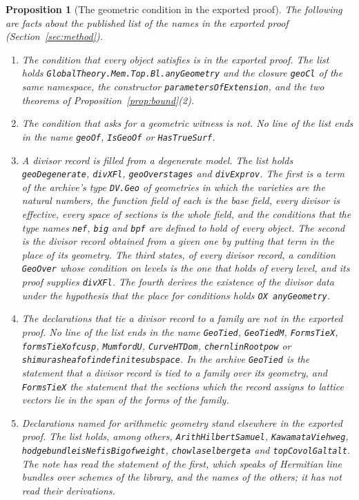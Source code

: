 \documentclass[11pt]{article}
\newtheorem{proposition}[theorem]{Proposition}
\theoremstyle{definition}
\theoremstyle{remark}
\DeclareRobustCommand{\lean}[1]{{\renewcommand{\_}{\textunderscore\allowbreak}\texttt{#1}}}
\begin{document}
\begin{proposition}[The geometric condition in the exported proof]\label{prop:compiled}
The following are facts about the published list of the names in the exported proof (Section~\ref{sec:method}).
\begin{enumerate}[leftmargin=2em,itemsep=1pt]\sloppy
\item \emph{The condition that every object satisfies is in the exported proof.} The list holds \lean{GlobalTheory.Mem.Top.Bl.anyGeometry} and the closure \lean{geoCl} of the same namespace, the constructor \lean{parametersOfExtension}, and the two theorems of Proposition~\ref{prop:bound}(2).
\item \emph{The condition that asks for a geometric witness is not.} No line of the list ends in the name \lean{geoOf}, \lean{IsGeoOf} or \lean{HasTrueSurf}.
\item \emph{A divisor record is filled from a degenerate model.} The list holds \lean{geoDegenerate}, \lean{divXFl}, \lean{geoOver\_stages} and \lean{divEx\_prov}. The first is a term of the archive's type \lean{DV.Geo} of geometries in which the varieties are the natural numbers, the function field of each is the base field, every divisor is effective, every space of sections is the whole field, and the conditions that the type names \lean{nef}, \lean{big} and \lean{bpf} are defined to hold of every object. The second is the divisor record obtained from a given one by putting that term in the place of its geometry. The third states, of every divisor record, a condition \lean{GeoOver} whose condition on levels is the one that holds of every level, and its proof supplies \lean{divXFl}. The fourth derives the existence of the divisor data under the hypothesis that the place for conditions holds \lean{OX anyGeometry}.
\item \emph{The declarations that tie a divisor record to a family are not in the exported proof.} No line of the list ends in the name \lean{GeoTied}, \lean{GeoTiedM}, \lean{FormsTieX}, \lean{formsTieX\_of\_cusp}, \lean{MumfordU}, \lean{CurveHTDom}, \lean{chern\_linRoot\_pow} or \lean{shimura\_sheaf\_of\_indefinite\_subspace}. In the archive \lean{GeoTied} is the statement that a divisor record is tied to a family over its geometry, and \lean{FormsTieX} the statement that the sections which the record assigns to lattice vectors lie in the span of the forms of the family.
\item \emph{Declarations named for arithmetic geometry stand elsewhere in the exported proof.} The list holds, among others, \lean{ArithHilbertSamuel}, \lean{KawamataViehweg}, \lean{hodge\_bundle\_isNef\_isBig\_of\_weight}, \lean{chowla\_selberg\_eta} and \lean{topCovolG\_alt\_alt}. The note has read the statement of the first, which speaks of Hermitian line bundles over schemes of the library, and the names of the others; it has not read their derivations.
\end{enumerate}
\end{proposition}
\end{document}
